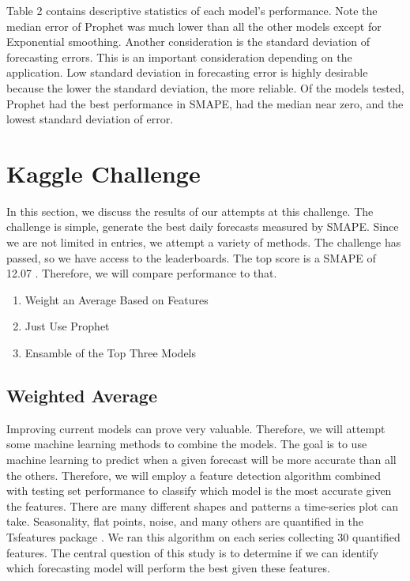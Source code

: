 \documentclass[16pt,twocolumn,letterpaper,titlepage]{article}
\begin{document}
Table 2 contains descriptive statistics of each model's performance. Note the median error of Prophet was much lower than all the other models except for Exponential smoothing. Another consideration is the standard deviation of forecasting errors. This is an important consideration depending on the application. Low standard deviation in forecasting error is highly desirable because the lower the standard deviation, the more reliable. Of the models tested, Prophet had the best performance in SMAPE, had the median near zero, and the lowest standard deviation of error. 



\section{Kaggle Challenge}

In this section, we discuss the results of our attempts at this challenge. The challenge is simple, generate the best daily forecasts measured by SMAPE. Since we are not limited in entries, we attempt a variety of methods. The challenge has passed, so we have access to the leaderboards. The top score is a SMAPE of 12.07 \cite{kaggle}. Therefore, we will compare performance to that.


\begin{enumerate}
\item Weight an Average Based on Features
\item Just Use Prophet
\item Ensamble of the Top Three Models
\end{enumerate}

\subsection{Weighted Average}

Improving current models can prove very valuable. Therefore, we will attempt some machine learning methods to combine the models. The goal is to use machine learning to predict when a given forecast will be more accurate than all the others. Therefore, we will employ a feature detection algorithm combined with testing set performance to classify which model is the most accurate given the features. There are many different shapes and patterns a time-series plot can take. Seasonality, flat points, noise, and many others are quantified in the Tsfeatures package \cite{montero2020fforma}. We ran this algorithm on each series collecting 30 quantified features. The central question of this study is to determine if we can identify which forecasting model will perform the best given these features.
\end{document}
